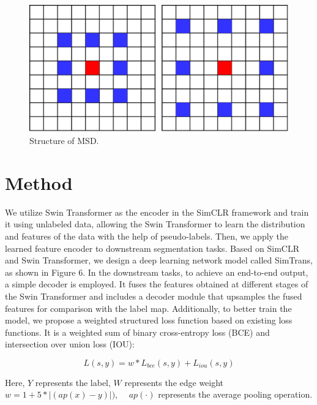 \documentclass[10pt,twocolumn,a4paper]{article}
\begin{document}
\begin{figure}[htbp]   %
	\centering
	\includegraphics[width=\linewidth,scale=1.00]{Images/MSD.png}
	\caption{Structure of MSD.}
	\label{fig:msd}
\end{figure}


\section{Method}
\label{sec:method}

We utilize Swin Transformer as the encoder in the SimCLR framework and train it using unlabeled data, allowing the Swin Transformer to learn the distribution and features of the data with the help of pseudo-labels. Then, we apply the learned feature encoder to downstream segmentation tasks. Based on SimCLR and Swin Transformer, we design a deep learning network model called SimTrans, as shown in Figure 6. In the downstream tasks, to achieve an end-to-end output, a simple decoder is employed. It fuses the features obtained at different stages of the Swin Transformer and includes a decoder module that upsamples the fused features for comparison with the label map. Additionally, to better train the model, we propose a weighted structured loss function based on existing loss functions. It is a weighted sum of binary cross-entropy loss (BCE) and intersection over union loss (IOU):

\begin{equation}
  L(s, y)=w * L_{b c e}(s, y)+L_{i o u}(s, y)
\end{equation}

Here, $Y$ represents the label, $W$ represents the edge weight $w=1+5 *|(a p(x)-y)|)$, $\quad a p(\cdot)$ represents the average pooling operation.
\end{document}
